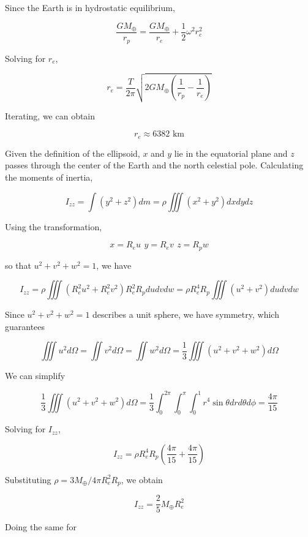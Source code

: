 \documentclass[11pt]{article}
\begin{document}
\begin{pproblem}
    \begin{pssolution*}{}{}
        \begin{alternativas}
            \item Since the Earth is in hydrostatic equilibrium,
            
            \[\frac{GM_\oplus}{r_p} = \frac{GM_\oplus}{r_e}+\frac{1}{2}\omega^2 r_e^2\]
        
            Solving for \(r_e\),

            \[r_e = \frac{T}{2\pi}\sqrt{2GM_\oplus\left(\frac{1}{r_p}-\frac{1}{r_e}\right)}\]

            Iterating, we can obtain

            \[r_e \approx 6382 \text{ km}\]

            \item Given the definition of the ellipsoid, \(x\) and \(y\) lie in the equatorial plane and \(z\) passes through the center of the Earth and the north celestial pole. Calculating the moments of inertia,
            
            \[I_{zz} = \int(y^2+z^2)dm = \rho \iiint (x^2+y^2)dxdydz\]

            Using the transformation,

            \[x = R_e u \, \ y = R_e v \, \ z = R_p w\]

            so that \(u^2+v^2+w^2=1\), we have

            \[I_{zz} = \rho\iiint (R_e^2u^2+R_e^2v^2) R_e^2R_pdudvdw = \rho R_e^4R_p \iiint (u^2+v^2)dudvdw\]

            Since \(u^2+v^2+w^2=1\) describes a unit sphere, we have symmetry, which guarantees

            \[\iiint u^2d\Omega = \iint v^2d\Omega = \iint w^2d\Omega = \frac{1}{3}\iiint(u^2+v^2+w^2)d\Omega\]

            We can simplify

            \[\frac{1}{3}\iiint(u^2+v^2+w^2)d\Omega = \frac{1}{3}\int_0^{2\pi}\int_{0}^{\pi}\int_0^1 r^4\sin\theta drd\theta d\phi = \frac{4\pi}{15}\]

            Solving for \(I_{zz}\),

            \[I_{zz} = \rho R_e^4 R_p \left(\frac{4\pi}{15}+\frac{4\pi}{15}\right)\]

            Substituting \(\rho = 3M_\oplus/4\pi R_e^2R_p\), we obtain

            \[I_{zz} = \frac{2}{5}M_\oplus R_e^2\]

            Doing the same for


\end{alternativas}
\end{pssolution*}
\end{pproblem}
\end{document}
